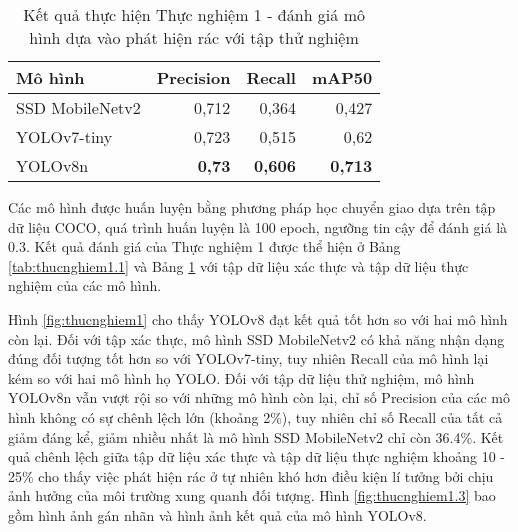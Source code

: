 \documentclass[../the.tex]{subfiles}
\begin{document}
\begin{table}[h!]
    \centering
    \begin{threeparttable}
        \caption{Kết quả thực hiện Thực nghiệm 1 - đánh giá mô hình dựa vào phát hiện rác với tập thử nghiệm}
        \begin{tabular}{lrrr}
            \hline
            \textbf{Mô hình} & \textbf{Precision} & \textbf{Recall} & \textbf{mAP50}  \\ \hline
            SSD MobileNetv2  & 0,712              & 0,364           & 0,427                                       \\ \hline
            YOLOv7-tiny      & 0,723              & 0,515           & 0,62                               \\ \hline
            YOLOv8n          & \textbf{0,73}      & \textbf{0,606}  & \textbf{0,713}                             \\ \hline
        \end{tabular}
        \label{tab:thucnghiem1.2}
    \end{threeparttable}
\end{table}

{\fontsize{13}{12} \selectfont

Các mô hình được huấn luyện bằng phương pháp học chuyển giao dựa trên tập dữ liệu COCO, quá trình huấn luyện là 100 epoch, ngưỡng tin cậy để đánh giá là 0.3.
Kết quả đánh giá của Thực nghiệm 1 được thể hiện ở Bảng \ref{tab:thucnghiem1.1}
và Bảng \ref{tab:thucnghiem1.2} với tập dữ liệu xác thực và tập dữ liệu thực nghiệm của các mô hình.

}

\bigskip

{\fontsize{13}{12} \selectfont

    Hình \ref{fig:thucnghiem1} cho thấy YOLOv8 đạt kết quả tốt hơn so với hai mô hình còn lại. Đối với tập xác thực, mô hình SSD MobileNetv2 có khả năng nhận dạng đúng đối tượng tốt hơn so với YOLOv7-tiny, tuy nhiên Recall của mô hình lại kém so với hai mô hình họ YOLO.
    Đối với tập dữ liệu thử nghiệm, mô hình YOLOv8n vẫn vượt rội so với những mô hình còn lại, chỉ số Precision của các mô hình không có sự chênh lệch lớn (khoảng 2\%), tuy nhiên chỉ số Recall của tất cả giảm đáng kể, giảm nhiều nhất là mô hình SSD MobileNetv2 chỉ còn 36.4\%.
    Kết quả chênh lệch giữa tập dữ liệu xác thực và tập dữ liệu thực nghiệm khoảng 10 - 25\% cho thấy việc phát hiện rác ở tự nhiên khó hơn điều kiện lí tưởng bởi chịu ảnh hưởng của môi trường xung quanh đối tượng.
    Hình \ref{fig:thucnghiem1.3} bao gồm hình ảnh gán nhãn và hình ảnh kết quả của mô hình YOLOv8.

}
\end{document}

